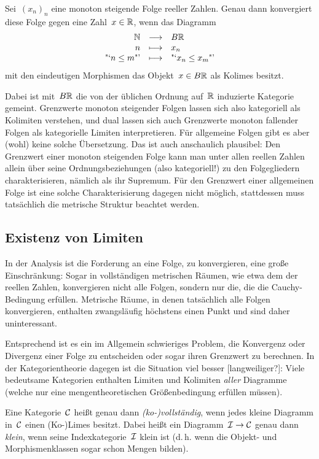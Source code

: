 \begin{prop}Sei~$(x_n)_n$ eine monoton steigende Folge reeller Zahlen. Genau dann
konvergiert diese Folge gegen eine Zahl~$x \in \mathbb{R}$, wenn das Diagramm
\[ \begin{array}{@{}rcl@{}}
  \NN &\longrightarrow& B\RR \\
  n &\longmapsto& x_n \\
  \text{"`$n \leq m$"'} &\longmapsto& \text{"`$x_n \leq x_m$"'}
\end{array} \]
mit den eindeutigen Morphismen das Objekt~$x \in B\mathbb{R}$ als Kolimes besitzt.
\end{prop}
Dabei ist mit~$B\mathbb{R}$ die von der üblichen Ordnung auf~$\mathbb{R}$ induzierte
Kategorie gemeint. Grenzwerte monoton steigender Folgen lassen sich also
kategoriell als Kolimiten verstehen, und dual lassen sich auch Grenzwerte
monoton fallender Folgen als kategorielle Limiten interpretieren. Für
allgemeine Folgen gibt es aber (wohl) keine solche Übersetzung. Das ist auch
anschaulich plausibel: Den Grenzwert einer monoton steigenden Folge kann man
unter allen reellen Zahlen allein über seine Ordnungsbeziehungen (also kategoriell!) zu
den Folgegliedern charakterisieren, nämlich als ihr Supremum. Für den Grenzwert
einer allgemeinen Folge ist eine solche Charakterisierung dagegen nicht
möglich, stattdessen muss tatsächlich die metrische Struktur beachtet werden.


\subsection{Existenz von Limiten}

In der Analysis ist die Forderung an eine Folge, zu konvergieren, eine große
Einschränkung: Sogar in vollständigen metrischen Räumen, wie etwa dem der
reellen Zahlen, konvergieren nicht alle Folgen, sondern nur die, die die
Cauchy-Bedingung erfüllen. Metrische Räume, in denen tatsächlich alle Folgen
konvergieren, enthalten zwangsläufig höchstens einen Punkt und sind daher
uninteressant.

Entsprechend ist es ein im Allgemein schwieriges Problem, die Konvergenz oder
Divergenz einer Folge zu entscheiden oder sogar ihren Grenzwert zu berechnen.
In der Kategorientheorie dagegen ist die Situation viel besser [langweiliger?]: Viele
bedeutsame Kategorien enthalten Limiten und Kolimiten \emph{aller} Diagramme
(welche nur eine mengentheoretischen Größenbedingung erfüllen müssen).

\begin{defn}Eine Kategorie~$\mathcal{C}$ heißt genau dann \emph{(ko-)vollständig}, wenn
jedes kleine Diagramm in~$\mathcal{C}$ einen (Ko-)Limes besitzt. Dabei heißt ein
Diagramm~$\mathcal{I} \to \mathcal{C}$ genau dann \emph{klein}, wenn seine Indexkategorie~$\mathcal{I}$
klein ist (d.\,h. wenn die Objekt- und Morphismenklassen sogar schon Mengen
bilden).\end{defn}


